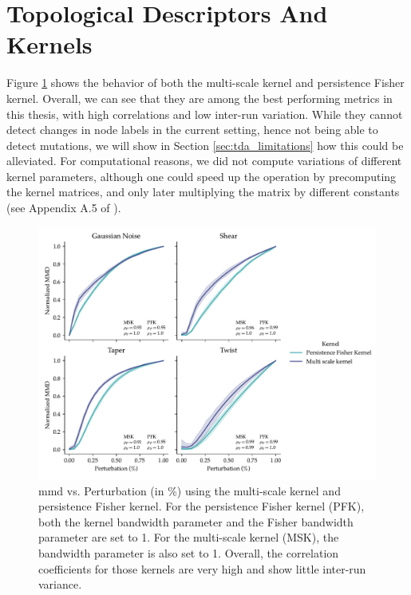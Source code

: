 \section{Topological Descriptors And Kernels}\label{sec:results_topo_kernels}

Figure \ref{fig:tda_kernels} shows the behavior of both the multi-scale kernel
and persistence Fisher kernel. Overall, we can see that they are among the best
performing metrics in this thesis, with high correlations and low inter-run
variation. While they cannot detect changes in node labels in the current
setting, hence not being able to detect mutations, we will show in Section
\ref{sec:tda_limitations} how this could be alleviated. For computational
reasons, we did not compute variations of different kernel parameters, although
one could speed up the operation by precomputing the kernel matrices, and only
later multiplying the matrix by different constants (see Appendix A.5 of
\cite{obray2022evaluation}).

\begin{figure}
  \centering
  \includegraphics[width=\textwidth]{./figures/results/res_6.pdf}
  \caption[\acrshort{mmd} using topological kernels.]{\acrshort{mmd} vs. Perturbation (in \%) using the multi-scale
kernel and persistence Fisher kernel. For the persistence Fisher kernel (PFK), both
the kernel bandwidth parameter and the Fisher bandwidth parameter are set to 1.
For the multi-scale kernel (MSK), the bandwidth parameter is also set to 1. Overall,
the correlation coefficients for those kernels are very high and show little
inter-run variance.}
  \label{fig:tda_kernels}
\end{figure}


